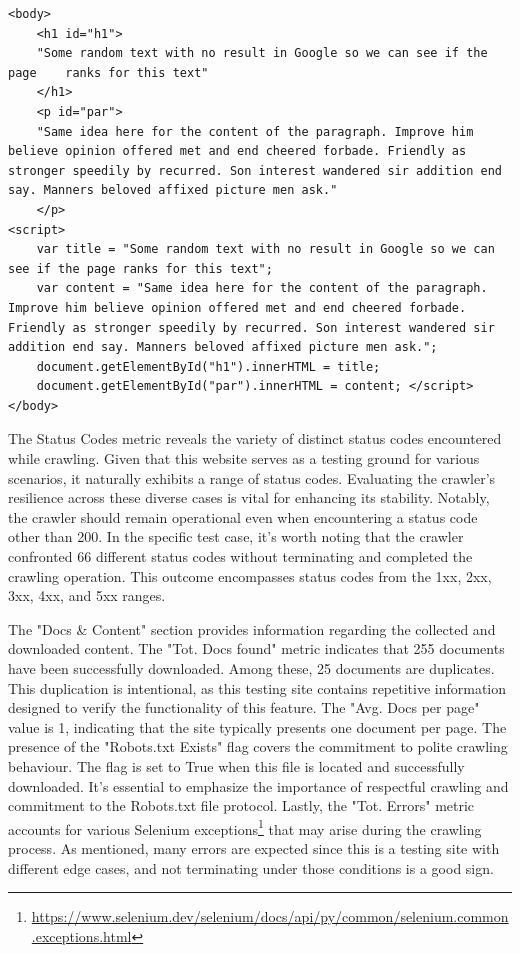 {\begin{lstlisting}[caption={The dynamically-inserted-text link content after rendering},captionpos=b, label={lst:rendered}]
<body>
	<h1 id="h1">
	"Some random text with no result in Google so we can see if the page 	ranks for this text"
	</h1> 
	<p id="par">
	"Same idea here for the content of the paragraph. Improve him believe opinion offered met and end cheered forbade. Friendly as stronger speedily by recurred. Son interest wandered sir addition end say. Manners beloved affixed picture men ask."
	</p>
<script>
	var title = "Some random text with no result in Google so we can see if the page ranks for this text";
	var content = "Same idea here for the content of the paragraph. Improve him believe opinion offered met and end cheered forbade. Friendly as stronger speedily by recurred. Son interest wandered sir addition end say. Manners beloved affixed picture men ask."; 
	document.getElementById("h1").innerHTML = title; 
	document.getElementById("par").innerHTML = content; </script>
</body>
\end{lstlisting}

The Status Codes metric reveals the variety of distinct status codes encountered while crawling. Given that this website serves as a testing ground for various scenarios, it naturally exhibits a range of status codes. Evaluating the crawler's resilience across these diverse cases is vital for enhancing its stability. Notably, the crawler should remain operational even when encountering a status code other than 200.
In the specific test case, it's worth noting that the crawler confronted 66 different status codes without terminating and completed the crawling operation. This outcome encompasses status codes from the 1xx, 2xx, 3xx, 4xx, and 5xx ranges.

The "Docs \& Content" section provides information regarding the collected and downloaded content. The "Tot. Docs found" metric indicates that 255 documents have been successfully downloaded. Among these, 25 documents are duplicates. This duplication is intentional, as this testing site contains repetitive information designed to verify the functionality of this feature.
The "Avg. Docs per page" value is 1, indicating that the site typically presents one document per page. The presence of the "Robots.txt Exists" flag covers the commitment to polite crawling behaviour. The flag is set to True when this file is located and successfully downloaded. It's essential to emphasize the importance of respectful crawling and commitment to the Robots.txt file protocol.
Lastly, the "Tot. Errors" metric accounts for various Selenium exceptions\footnote{\url{https://www.selenium.dev/selenium/docs/api/py/common/selenium.common.exceptions.html}} that may arise during the crawling process. As mentioned, many errors are expected since this is a testing site with different edge cases, and not terminating under those conditions is a good sign.


}
